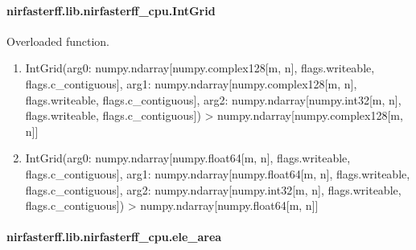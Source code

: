 \documentclass[letterpaper,10pt,english]{sphinxmanual}
\begin{document}
\sphinxstepscope


\paragraph{nirfasterff.lib.nirfasterff\_cpu.IntGrid}
\label{\detokenize{_autosummary/nirfasterff.lib.nirfasterff_cpu.IntGrid:nirfasterff-lib-nirfasterff-cpu-intgrid}}\label{\detokenize{_autosummary/nirfasterff.lib.nirfasterff_cpu.IntGrid::doc}}

\begin{fulllineitems}
\label{\detokenize{_autosummary/nirfasterff.lib.nirfasterff_cpu.IntGrid:nirfasterff.lib.nirfasterff_cpu.IntGrid}}
\pysigstartsignatures
{}
\pysigstopsignatures
\sphinxAtStartPar
Overloaded function.
\begin{enumerate}
%
\item {} 
\sphinxAtStartPar
IntGrid(arg0: numpy.ndarray{[}numpy.complex128{[}m, n{]}, flags.writeable, flags.c\_contiguous{]}, arg1: numpy.ndarray{[}numpy.complex128{[}m, n{]}, flags.writeable, flags.c\_contiguous{]}, arg2: numpy.ndarray{[}numpy.int32{[}m, n{]}, flags.writeable, flags.c\_contiguous{]}) \sphinxhyphen{}\textgreater{} numpy.ndarray{[}numpy.complex128{[}m, n{]}{]}

\item {} 
\sphinxAtStartPar
IntGrid(arg0: numpy.ndarray{[}numpy.float64{[}m, n{]}, flags.writeable, flags.c\_contiguous{]}, arg1: numpy.ndarray{[}numpy.float64{[}m, n{]}, flags.writeable, flags.c\_contiguous{]}, arg2: numpy.ndarray{[}numpy.int32{[}m, n{]}, flags.writeable, flags.c\_contiguous{]}) \sphinxhyphen{}\textgreater{} numpy.ndarray{[}numpy.float64{[}m, n{]}{]}

\end{enumerate}

\end{fulllineitems}


\sphinxstepscope


\paragraph{nirfasterff.lib.nirfasterff\_cpu.ele\_area}
\label{\detokenize{_autosummary/nirfasterff.lib.nirfasterff_cpu.ele_area:nirfasterff-lib-nirfasterff-cpu-ele-area}}\label{\detokenize{_autosummary/nirfasterff.lib.nirfasterff_cpu.ele_area::doc}}
\end{document}
